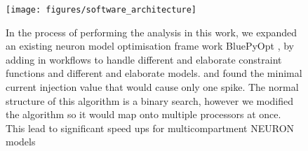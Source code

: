 \begin{figure}    
\begin{center}
\texttt{[image: figures/software\_architecture]}
\caption{In the process of performing the analysis in this work, we expanded an existing neuron model optimisation frame work BluePyOpt \cite{bluepyopt}, by adding in workflows to handle different and elaborate constraint functions and different and elaborate models. and found the minimal current injection value that would cause only one spike. The normal structure of this algorithm is a binary search, however we modified the algorithm so it would map onto multiple processors at once. This lead to significant speed ups for multicompartment NEURON models}

\end{center}
\end{figure}


